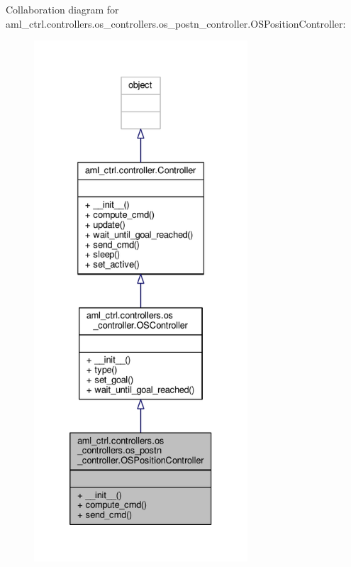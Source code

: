 Collaboration diagram for aml\-\_\-ctrl.\-controllers.\-os\-\_\-controllers.\-os\-\_\-postn\-\_\-controller.\-O\-S\-Position\-Controller\-:\nopagebreak
\begin{figure}[H]
\begin{center}
\leavevmode
\includegraphics[height=550pt]{classaml__ctrl_1_1controllers_1_1os__controllers_1_1os__postn__controller_1_1_o_s_position_controller__coll__graph}
\end{center}
\end{figure}
